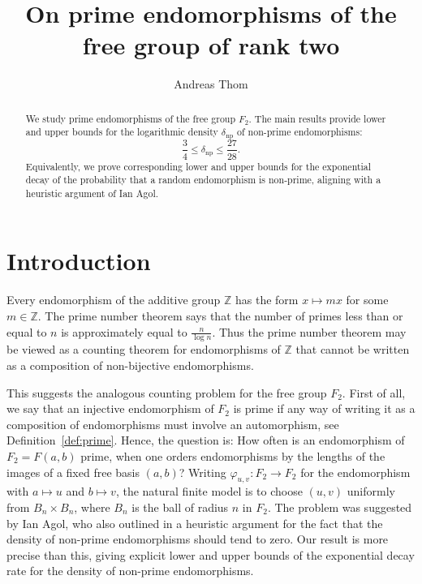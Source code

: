 \documentclass{amsproc}
\author{Andreas Thom}
\begin{document}
\title{On prime endomorphisms of the free group of rank two}


\begin{abstract}
We study prime endomorphisms of the free group $F_2$. The main results provide lower and upper bounds for the logarithmic density $\delta_{\mathrm{np}}$ of non-prime endomorphisms:
$$
\frac34 \leq       \delta_{\mathrm{np}}\leq \frac{27}{28}.
$$
Equivalently, we prove corresponding lower and upper bounds for the exponential decay of the probability that a random endomorphism is non-prime, aligning with a heuristic argument of Ian Agol.
\end{abstract}

\maketitle

\tableofcontents

\section*{Introduction}

Every endomorphism of the additive group $\mathbb Z$ has the form
$x\mapsto mx$ for some $m\in\mathbb Z$. The prime number theorem says that the number of primes less than or equal to $n$ is approximately equal to $\frac{n}{\log n}$. Thus the prime number theorem may be viewed as a counting theorem for endomorphisms of $\mathbb Z$ that cannot be written as a composition of non-bijective endomorphisms.

This suggests the analogous counting problem for the free group $F_2$. First of all, we say that an injective endomorphism of $F_2$ is prime if any way of writing it as a composition of endomorphisms must involve an automorphism, see Definition~\ref{def:prime}. Hence, the question is: How often is an endomorphism of $F_2 = F(a,b)$ prime, when one orders endomorphisms by the lengths of the images of a fixed free basis $(a,b)$?  Writing $\varphi_{u,v} \colon F_2 \to F_2$ for the
endomorphism with $a\mapsto u$ and $b\mapsto v$, the natural finite model is to
choose $(u,v)$ uniformly from $B_n\times B_n$, where $B_n$ is the ball of
radius $n$ in $F_2$.  The problem was suggested by Ian Agol, who also outlined
in \cite{ThomMO} a heuristic argument for the fact that the density of non-prime endomorphisms should tend to zero. Our result is more precise than this, giving explicit lower and upper bounds of the exponential decay rate for the density of non-prime endomorphisms.
\end{document}
